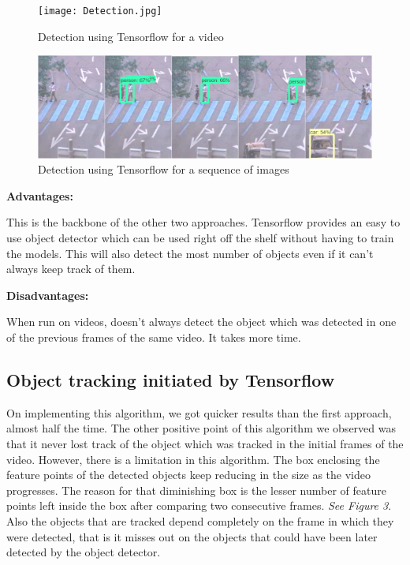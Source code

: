 \documentclass[10pt,twocolumn,letterpaper]{article}
\begin{document}
\begin{figure}
\texttt{[image: Detection.jpg]}
\caption{Detection using Tensorflow for a video }
\end{figure}


\begin{figure}
\includegraphics[width=\linewidth]{Detection_images.jpg}
\caption{Detection using Tensorflow for a sequence of images}
\end{figure}

\textbf{Advantages:}

This is the backbone of the other two approaches.
Tensorflow provides an easy to use object detector which can be used right off the shelf without having to train the models. This will also detect the most number of objects even if it can't always keep track of them.

\textbf{Disadvantages:}

When run on videos, doesn’t always detect the object which was detected in one of the previous frames of the same video. 
It takes more time.

\subsection{Object tracking initiated by Tensorflow}  

On implementing this algorithm, we got quicker results than the first approach, almost half the time. The other positive point of this algorithm we observed was that it never lost track of the object which was tracked in the initial frames of the video. However, there is a limitation in this algorithm. The box enclosing the feature points of the detected objects keep reducing in the size as the video progresses. The reason for that diminishing box is the lesser number of feature points left inside the box after comparing two consecutive frames.\textit{ See Figure 3}.
Also the objects that are tracked depend completely on the frame in which they were detected, that is it misses out on the objects that could have been later detected by the object detector.
\end{document}
